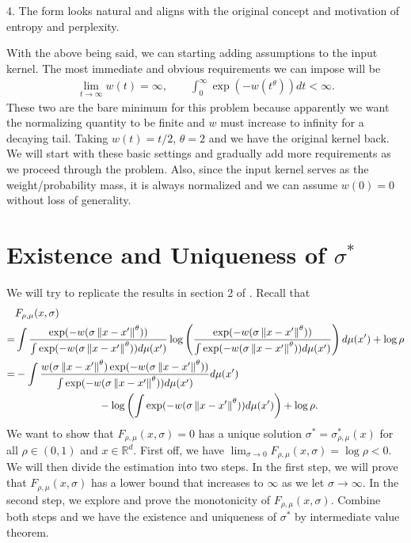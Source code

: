 \documentclass[10pt]{article}
\begin{document}
4. The form looks natural and aligns with the original concept and motivation of entropy and perplexity.

With the above being said, we can starting adding assumptions to the input
kernel. The most immediate and obvious requirements we can impose will be
\begin{align}
    \lim_{t \to \infty} w(t) = \infty, \qquad \int_0^{\infty} \exp(-w(t^{\theta})) dt < \infty.
\end{align}
These two are the bare minimum for this problem because apparently we want the normalizing quantity to be finite and $w$ must increase to infinity for a decaying tail. Taking $w(t) = t/2$, $\theta = 2$ and we have the original kernel back. We will start with these basic settings and gradually add more requirements as we proceed through the problem. Also, since the input kernel serves as the weight/probability mass, it is always normalized and we can assume $w(0) = 0$ without loss of generality.
\section{Existence and Uniqueness of \texorpdfstring{$\sigma^*$}{Lg}}
We will try to replicate the results in section 2 of \citep{auffinger-tsne}. Recall that
\begin{align} \label{big_F_formula}
      & F_{\rho,\mu}(x,\sigma) \nonumber                                                                                                                                                                                                                    \\
    = & \int \frac{\exp(-w(\sigma\left\lVert x-x'\right\rVert^{\theta}))}{\int \exp(-w(\sigma\left\lVert x-x'\right\rVert^{\theta})) d\mu(x')} \log\left(\frac{\exp(-w(\sigma\left\lVert x-x'\right\rVert^{\theta}))}{\int \exp(-w(\sigma\left\lVert x-x'\right\rVert^{\theta})) d\mu(x')}\right)d\mu(x') + \log \rho \nonumber \\
    = & -\int \frac{w(\sigma\left\lVert x-x'\right\rVert^{\theta})\exp(-w(\sigma\left\lVert x-x'\right\rVert^{\theta}))}{\int \exp(-w(\sigma\left\lVert x-x'\right\rVert^{\theta})) d\mu(x')} d\mu(x') \nonumber                                                                                               \\
      & \qquad \qquad \qquad \qquad - \log \left(\int \exp(-w(\sigma\left\lVert x-x'\right\rVert^{\theta}))d\mu(x')\right)  + \log \rho.
\end{align}
We want to show that $F_{\rho,\mu}(x,\sigma) = 0$ has a unique solution $\sigma^* = \sigma_{\rho,\mu}^*(x)$ for all $\rho \in (0,1)$ and $x \in \mathbb{R}^d$. First off, we have $\lim_{\sigma \to 0}F_{\rho,\mu}(x,\sigma) = \log \rho <0$. We will then divide the estimation into two steps. In the first step, we will prove that $F_{\rho,\mu}(x,\sigma)$ has a lower bound that increases to $\infty$ as we let $\sigma \to \infty$. In the second step, we explore and prove the monotonicity of $F_{\rho,\mu}(x,\sigma)$. Combine both steps and we have the existence and uniqueness of $\sigma^*$ by intermediate value theorem.
\end{document}
